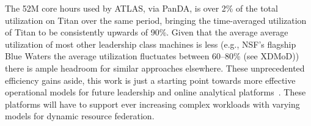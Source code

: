 The 52M core hours used by ATLAS, via PanDA, is over 2\% of the total
utilization on Titan over the same period, bringing the time-averaged
utilization of Titan to be consistently upwards of 90\%. Given that the
average average utilization of most other leadership class machines is less
(e.g., NSF's flagship Blue Waters the average utilization fluctuates between
60--80\% (see XDMoD\cite{bw-sucks})) there is ample headroom for similar
approaches elsewhere. These unprecedented efficiency gains aside, this work
is just a starting point towards more effective operational models for future
leadership and online analytical platforms~\cite{foap-url}. These platforms
will have to support ever increasing complex workloads with varying models
for dynamic resource federation.

